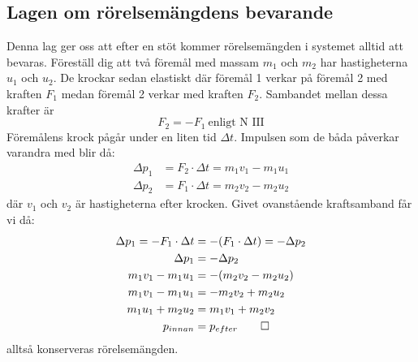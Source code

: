 \subsection{Lagen om rörelsemängdens bevarande}
\label{derive:conserverationmomentum}
Denna lag ger oss att efter en stöt kommer rörelsemängden i systemet alltid att bevaras. Föreställ dig att två föremål med massam $m_1$ och $m_2$ har hastigheterna $u_1$ och $u_2$. De krockar sedan elastiskt där föremål 1 verkar på föremål 2 med kraften $F_1$ medan föremål 2 verkar med kraften $F_2$. Sambandet mellan dessa krafter är
\begin{equation*}
    F_2 = -F_1 \: \text{enligt N III}
\end{equation*}
Föremålens krock pågår under en liten tid $\Delta t$. Impulsen som de båda påverkar varandra med blir då:
\begin{align*}
    \Delta p_1 &= F_2 \cdot \Delta t = m_1v_1 - m_1u_1 \\
    \Delta p_2 &= F_1 \cdot \Delta t = m_2v_2 - m_2u_2
\end{align*}
där $v_1$ och $v_2$ är hastigheterna efter krocken. Givet ovanstående kraftsamband får vi då:
\begin{align*}
    \Delta p_1 = -F_1 \cdot \Delta t &= -(F_1 \cdot \Delta t) = -\Delta p_2 \\
    \Delta p_1 &= -\Delta p_2 \\
    m_1v_1 - m_1u_1 &= -(m_2v_2 - m_2u_2) \\
    m_1v_1 - m_1u_1 &= -m_2v_2 + m_2u_2 \\
    m_1u_1 + m_2u_2 &= m_1v_1 + m_2v_2 \\
    p_{innan} &= p_{efter} \qed
\end{align*}
alltså konserveras rörelsemängden.

